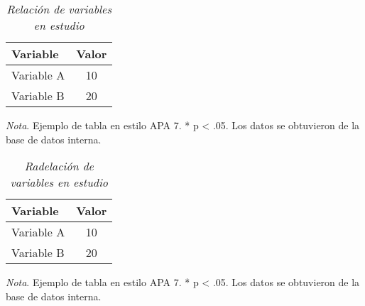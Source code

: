 \documentclass[12pt,letterpaper]{report}
\begin{document}
	\begin{table}[ht]
		\captionsetup{justification=raggedright,singlelinecheck=false}
		\caption{\textit{Relación de variables en estudio}}
		\label{tab:variables} %
		\centering
		\begin{tabular}{l c}
			\hline
			\textbf{Variable} & \textbf{Valor} \\
			\hline
			Variable A        & 10 \\
			Variable B        & 20 \\
			\hline
		\end{tabular}
		
		\begin{flushleft}
			\textit{Nota}. Ejemplo de tabla en estilo APA 7. * p < .05.  
			Los datos se obtuvieron de la base de datos interna.
		\end{flushleft}
	\end{table}
	\begin{table}[ht]
		\captionsetup{justification=raggedright,singlelinecheck=false}
		\caption{\textit{Radelación de variables en estudio}}
		
		\centering
		\begin{tabular}{l c}
			\hline
			\textbf{Variable} & \textbf{Valor} \\
			\hline
			Variable A        & 10 \\
			Variable B        & 20 \\
			\hline
		\end{tabular}
		
		\begin{flushleft}
			\textit{Nota}. Ejemplo de tabla en estilo APA 7. * p < .05.  
			Los datos se obtuvieron de la base de datos interna.
		\end{flushleft}
	\end{table}
\end{document}
